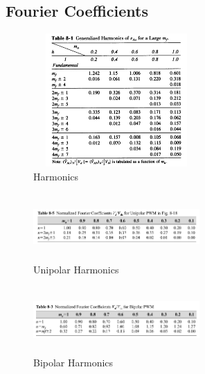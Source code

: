 \documentclass[twocolumn, ]{article}
\begin{document}
\subsection*{Fourier Coefficients}
\begin{figure}[!ht]
	\includegraphics[width=2.5in,height=2in]{pwm_harmonics_table.png}
	\caption{Harmonics}
\end{figure}
\begin{figure}[!ht]
	\includegraphics[width=2.5in,height=1in]{unipolar_harmonics2.png}
	\caption{Unipolar Harmonics}
\end{figure}
\begin{figure}[!ht]
	\includegraphics[width=2.5in,height=1in]{bipolar_harmonics2.png}
	\caption{Bipolar Harmonics}
\end{figure}
\end{document}
